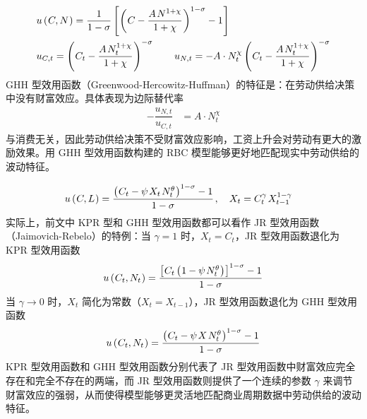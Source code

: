 \label{sec:GHH}
\begin{align*}
    &u\bka{C,N}=\dfrac1{1-\sigma}\bks{\bka{C-\dfrac{A\,N^{1+\chi}}{1+\chi}}^{1-\sigma}-1}\\
    &u_{C,t}=\bka{C_t-\dfrac{A\,N_t^{1+\chi}}{1+\chi}}^{-\sigma}\qquad u_{N,t}=-A\cdot N_t^\chi\bka{C_t-\dfrac{A\,N_t^{1+\chi}}{1+\chi}}^{-\sigma}
\end{align*}
GHH 型效用函数（Greenwood-Hercowitz-Huffman）的特征是：在劳动供给决策中没有财富效应。具体表现为边际替代率
\begin{align*}
    -\dfrac{u_{N,t}}{u_{C,t}}&=A\cdot N_t^\chi
\end{align*}
与消费无关，因此劳动供给决策不受财富效应影响，工资上升会对劳动有更大的激励效果。用 GHH 型效用函数构建的 RBC 模型能够更好地匹配现实中劳动供给的波动特征。

\label{sec:JR}
\begin{align*}
    &u\bka{C,L}=\dfrac{\bka{C_t-\psi\,X_t\,N^\theta_t}^{1-\sigma}-1}{1-\sigma}\,,\quad X_t=C_t^\gamma\,X_{t-1}^{1-\gamma}
\end{align*}
实际上，前文中 KPR 型和 GHH 型效用函数都可以看作 JR 型效用函数（Jaimovich-Rebelo）的特例：当 \(\gamma=1\) 时，\(X_t=C_t\)，JR 型效用函数退化为 KPR 型效用函数
\begin{align*}
    u\bka{C_t,N_t}=\dfrac{\bks{C_t\bka{1-\psi\,N^\theta_t}}^{1-\sigma}-1}{1-\sigma}
\end{align*}
当 \(\gamma\to0\) 时，\(X_t\) 简化为常数（\(X_t=X_{t-1}\)），JR 型效用函数退化为 GHH 型效用函数
\begin{align*}
    u\bka{C_t,N_t}=\dfrac{\bka{C_t-\psi\,X\,N^\theta_t}^{1-\sigma}-1}{1-\sigma}
\end{align*}
KPR 型效用函数和 GHH 型效用函数分别代表了 JR 型效用函数中财富效应完全存在和完全不存在的两端，而 JR 型效用函数则提供了一个连续的参数 \(\gamma\) 来调节财富效应的强弱，从而使得模型能够更灵活地匹配商业周期数据中劳动供给的波动特征。


\SymmetricGeometry
